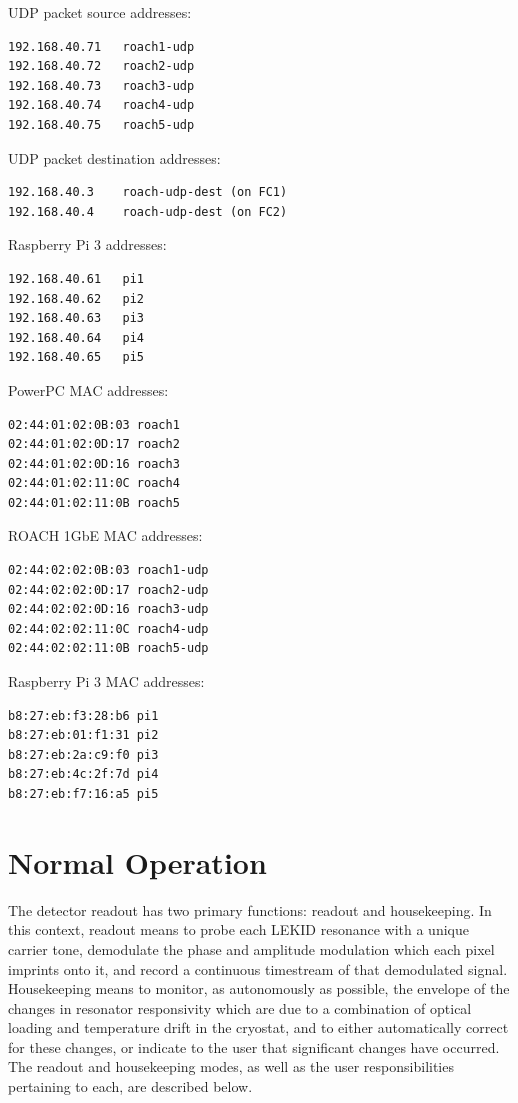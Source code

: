 UDP packet source addresses:
\begin{verbatim}
192.168.40.71	roach1-udp
192.168.40.72	roach2-udp
192.168.40.73	roach3-udp
192.168.40.74	roach4-udp
192.168.40.75	roach5-udp
\end{verbatim}

UDP packet destination addresses:
\begin{verbatim}
192.168.40.3	roach-udp-dest (on FC1)
192.168.40.4	roach-udp-dest (on FC2)
\end{verbatim}

Raspberry Pi 3 addresses:
\begin{verbatim}
192.168.40.61	pi1
192.168.40.62	pi2
192.168.40.63	pi3
192.168.40.64	pi4
192.168.40.65	pi5
\end{verbatim}

PowerPC MAC addresses:
\begin{verbatim}
02:44:01:02:0B:03 roach1
02:44:01:02:0D:17 roach2
02:44:01:02:0D:16 roach3
02:44:01:02:11:0C roach4
02:44:01:02:11:0B roach5
\end{verbatim}

ROACH 1GbE MAC addresses:
\begin{verbatim}
02:44:02:02:0B:03 roach1-udp
02:44:02:02:0D:17 roach2-udp
02:44:02:02:0D:16 roach3-udp
02:44:02:02:11:0C roach4-udp
02:44:02:02:11:0B roach5-udp
\end{verbatim}

Raspberry Pi 3 MAC addresses:
\begin{verbatim}
b8:27:eb:f3:28:b6 pi1
b8:27:eb:01:f1:31 pi2
b8:27:eb:2a:c9:f0 pi3
b8:27:eb:4c:2f:7d pi4
b8:27:eb:f7:16:a5 pi5
\end{verbatim}

\section{Normal Operation}
The detector readout has two primary functions: readout and housekeeping. In this context, readout means to probe each LEKID resonance with a unique carrier tone, demodulate the phase and amplitude modulation which each pixel imprints onto it, and record a continuous timestream of that demodulated signal. Housekeeping means to monitor, as autonomously as possible, the envelope of the changes in resonator responsivity which are due to a combination of optical loading and temperature drift in the cryostat, and to either automatically correct for these changes, or indicate to the user that significant changes have occurred. The readout and housekeeping modes, as well as the user responsibilities pertaining to each, are described below.

